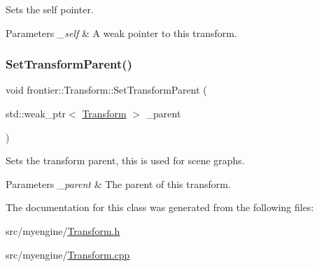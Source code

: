 Sets the self pointer. 


\begin{DoxyParams}{Parameters}
{\em \+\_\+self} & A weak pointer to this transform. \\
\hline
\end{DoxyParams}
\mbox{\label{classfrontier_1_1_transform_a95b6b6407a5ece2e6b188c2e1c2294a2}} 
\subsubsection{\texorpdfstring{Set\+Transform\+Parent()}{SetTransformParent()}}
{\footnotesize\ttfamily void frontier\+::\+Transform\+::\+Set\+Transform\+Parent (\begin{DoxyParamCaption}\item[{std\+::weak\+\_\+ptr$<$ \hyperlink{classfrontier_1_1_transform}{Transform} $>$}]{\+\_\+parent }\end{DoxyParamCaption})}



Sets the transform parent, this is used for scene graphs. 


\begin{DoxyParams}{Parameters}
{\em \+\_\+parent} & The parent of this transform. \\
\hline
\end{DoxyParams}


The documentation for this class was generated from the following files\+:\begin{DoxyCompactItemize}
\item 
src/myengine/\hyperlink{_transform_8h}{Transform.\+h}\item 
src/myengine/\hyperlink{_transform_8cpp}{Transform.\+cpp}\end{DoxyCompactItemize}
